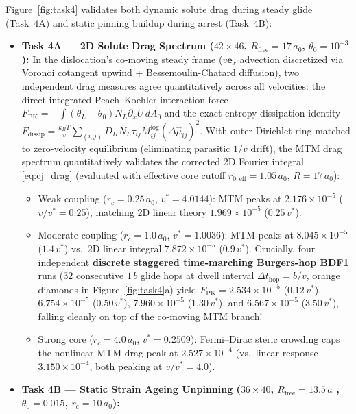 \documentclass[11pt,a4paper]{article}
\begin{document}
Figure~\ref{fig:task4} validates both dynamic solute drag during steady glide (Task~4A) and static pinning buildup during arrest (Task~4B):
\begin{itemize}[nosep]
  \item \textbf{Task 4A --- 2D Solute Drag Spectrum ($42 \times 46$, $R_{\text{free}} = 17\,a_0$, $\theta_0 = 10^{-3}$):}
  In the dislocation's co-moving steady frame ($v \mathbf{e}_x$ advection discretized via Voronoi cotangent upwind + Bessemoulin-Chatard diffusion), two independent drag measures agree quantitatively across all velocities: the direct integrated Peach--Koehler interaction force $F_{\text{PK}} = -\int (\theta_L - \theta_0)N_L \partial_x U\,dA_0$ and the exact entropy dissipation identity $F_{\text{dissip}} = \frac{k_B T}{v}\sum_{(i,j)} D_H N_L \tau_{ij} M_{ij}^{\text{log}}(\Delta\hat{\mu}_{ij})^2$. With outer Dirichlet ring matched to zero-velocity equilibrium (eliminating parasitic $1/v$ drift), the MTM drag spectrum quantitatively validates the corrected 2D Fourier integral \eqref{eq:cj_drag} (evaluated with effective core cutoff $r_{0,\text{eff}} = 1.05\,a_0$, $R = 17\,a_0$):
  \begin{itemize}[nosep]
    \item Weak coupling ($r_c = 0.25\,a_0$, $v^* = 4.0144$): MTM peaks at $2.176 \times 10^{-5}$ ($v/v^* = 0.25$), matching 2D linear theory $1.969 \times 10^{-5}$ ($0.25\,v^*$).
    \item Moderate coupling ($r_c = 1.0\,a_0$, $v^* = 1.0036$): MTM peaks at $8.045 \times 10^{-5}$ ($1.4\,v^*$) vs.\ 2D linear integral $7.872 \times 10^{-5}$ ($0.9\,v^*$). Crucially, four independent \textbf{discrete staggered time-marching Burgers-hop BDF1} runs ($32$ consecutive $1\,b$ glide hops at dwell interval $\Delta t_{\text{hop}} = b/v$, orange diamonds in Figure~\ref{fig:task4}a) yield $F_{\text{PK}} = 2.534\times 10^{-5}$ ($0.12\,v^*$), $6.754\times 10^{-5}$ ($0.50\,v^*$), $7.960\times 10^{-5}$ ($1.30\,v^*$), and $6.567\times 10^{-5}$ ($3.50\,v^*$), falling cleanly on top of the co-moving MTM branch!
    \item Strong core ($r_c = 4.0\,a_0$, $v^* = 0.2509$): Fermi--Dirac steric crowding caps the nonlinear MTM drag peak at $2.527 \times 10^{-4}$ (vs.\ linear response $3.150 \times 10^{-4}$, both peaking at $v/v^* = 4.0$).
  \end{itemize}
  \item \textbf{Task 4B --- Static Strain Ageing Unpinning ($36 \times 40$, $R_{\text{free}} = 13.5\,a_0$, $\theta_0 = 0.015$, $r_c = 10\,a_0$):}

\end{itemize}
\end{document}
